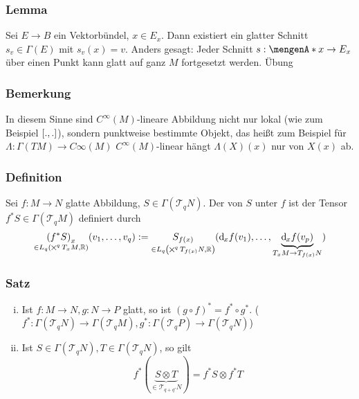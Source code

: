 \subsubsection{Lemma}
\label{ssub:179}
Sei $E\to B$ ein Vektorbündel, $x\in E_x$. Dann existiert ein glatter Schnitt $s_v\in \Gamma(E)$ mit $s_v(x) = v$. Anders gesagt: Jeder Schnitt $s:\set{x}\to E_x$ über einen Punkt kann glatt auf ganz $M$ fortgesetzt werden.
Übung

\subsubsection{Bemerkung}
\label{ssub:180}
In diesem Sinne sind $C^\infty (M)$-lineare Abbildung nicht nur lokal (wie zum Beispiel $\benbrace{.,.}$), sondern punktweise bestimmte Objekt, das heißt zum Beispiel für $\Lambda:\Gamma(TM)\to C\infty(M)$ $C^\infty(M)$-linear hängt $\Lambda(X)(x)$ nur von $X(x)$ ab.

\subsubsection{Definition}
\label{ssub:181}
Sei $f:M\to N$ glatte Abbildung, $S\in \Gamma(\mathcal{T}_q N)$. Der  von $S$ unter $f$ ist der Tensor $f^* S \in \Gamma(\mathcal{T}_q M)$ definiert durch
\[
\underset{\in L_q \enbrace*{\bigtimes^q T_x M,\mathds{R}}}{\enbrace*{f^* S}_x} \enbrace{v_1,\ldots,v_q} := \underset{\in L_q \enbrace*{\bigtimes^q T_{f(x)} N,\mathds{R}}}{S_{f(x)}} \enbrace{\mathd_x f(v_1),\ldots,\underbrace{\mathd_x f(v_p)}_{T_x M \to T_{f(x)} N}}
\]

\subsubsection[Satz:Funktionelle Eigenschaften]{Satz}
\label{ssub:182}
\begin{enumerate}[(i)]
\item Ist $f:M\to N,g:N\to P$ glatt, so ist $(g\circ f)^* = f^*\circ g^*$. ($f^*:\Gamma(\mathcal{T}_q N)\to \Gamma(\mathcal{T}_q M),g^*:\Gamma(\mathcal{T}_q P)\to \Gamma(\mathcal{T}_q N)$)
\item Ist $S\in \Gamma(\mathcal{T}_q N), T\in \Gamma(\mathcal{T}_q N)$, so gilt
\[
f^*(\underbrace{S\otimes T}_{\in \mathcal{T}_{q+q'} N}) = f^* S \otimes f^* T
\]
\end{enumerate}

